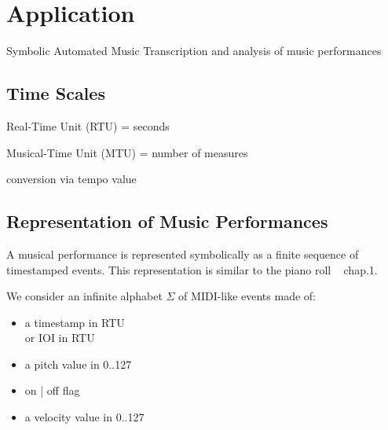 

\section{Application}
Symbolic Automated Music Transcription
and analysis of music performances

\subsection{Time Scales}
Real-Time Unit (RTU) = seconds

\noindent 
Musical-Time Unit (MTU) = number of measures

\noindent 
conversion via tempo value

\subsection{Representation of Music Performances}
A musical performance is represented symbolically as a finite sequence of timestamped events.
This representation is similar to the piano roll ~\cite{Muller15fundamentals} chap.1. 

\noindent
We consider an infinite alphabet $\Sigma$ of MIDI-like 
events made of:
\begin{itemize}
\item a timestamp in RTU\\ %
      or IOI in RTU
\item a pitch value in 0..127
\item \textsf{on} | \textsf{off} flag
\item a velocity value in 0..127
\end{itemize}
